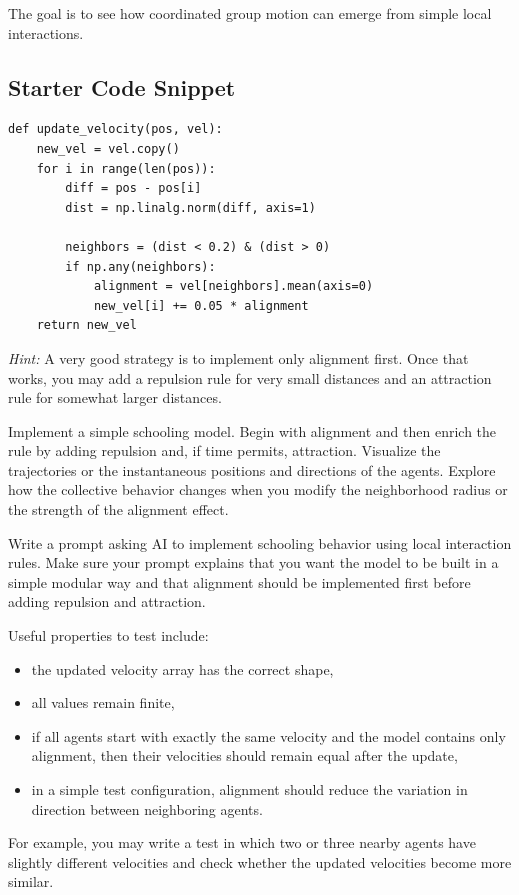 \documentclass[paper=letter, fontsize=12pt]{article}
\numberwithin{equation}{section}
\begin{document}
The goal is to see how coordinated group motion can emerge from simple local interactions.

\subsection*{Starter Code Snippet}

\begin{lstlisting}
def update_velocity(pos, vel):
    new_vel = vel.copy()
    for i in range(len(pos)):
        diff = pos - pos[i]
        dist = np.linalg.norm(diff, axis=1)

        neighbors = (dist < 0.2) & (dist > 0)
        if np.any(neighbors):
            alignment = vel[neighbors].mean(axis=0)
            new_vel[i] += 0.05 * alignment
    return new_vel
\end{lstlisting}

\emph{Hint:} A very good strategy is to implement only alignment first. Once that works, you may add a repulsion rule for very small distances and an attraction rule for somewhat larger distances.

\begin{taskbox}
Implement a simple schooling model. Begin with alignment and then enrich the rule by adding repulsion and, if time permits, attraction. Visualize the trajectories or the instantaneous positions and directions of the agents. Explore how the collective behavior changes when you modify the neighborhood radius or the strength of the alignment effect.
\end{taskbox}

\begin{aibox}
Write a prompt asking AI to implement schooling behavior using local interaction rules. Make sure your prompt explains that you want the model to be built in a simple modular way and that alignment should be implemented first before adding repulsion and attraction.
\end{aibox}

\begin{testbox}
Useful properties to test include:
\begin{itemize}
\item the updated velocity array has the correct shape,
\item all values remain finite,
\item if all agents start with exactly the same velocity and the model contains only alignment, then their velocities should remain equal after the update,
\item in a simple test configuration, alignment should reduce the variation in direction between neighboring agents.
\end{itemize}
For example, you may write a test in which two or three nearby agents have slightly different velocities and check whether the updated velocities become more similar.
\end{testbox}
\end{document}
